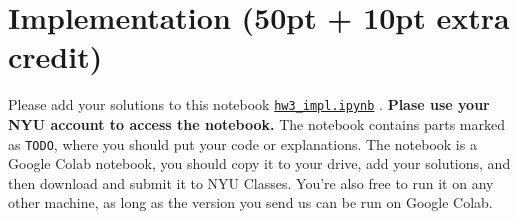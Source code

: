 \documentclass{article}
\begin{document}
\section{Implementation (50pt + 10pt extra credit)}

Please add your solutions to this notebook
\href{https://drive.google.com/file/d/1zDjkA0R8puzTkJsJqGLjqYhLfYLJtAMT/view?usp=sharing}{\texttt{hw3\_impl.ipynb}}
.
\textbf{Plase use your NYU account to access the notebook.} The notebook contains parts marked as \texttt{TODO}, where you should put your code or explanations. The notebook is a Google Colab notebook, you should copy it to your drive, add your solutions, and then download and submit it to NYU Classes. You're also free to run it on any other machine, as long as the version you send us can be run on Google Colab.
\end{document}
